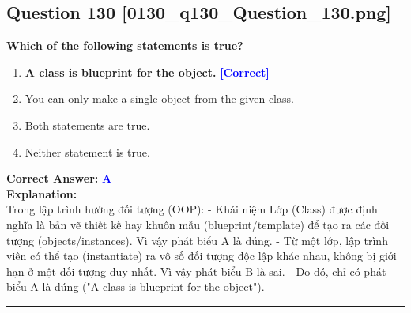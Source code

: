 \documentclass[11pt,a4paper]{article}
\begin{document}
\begin{minipage}{\textwidth}
\subsection*{Question 130 \quad \footnotesize{[0130_q130_Question_130.png]}}
\noindent \textbf{Which of the following statements is true?}

\begin{enumerate}[label=\Alph*.]
    \item \textbf{A class is blueprint for the object.} \hfill \textcolor{blue}{\textbf{[Correct]}}
    \item You can only make a single object from the given class.
    \item Both statements are true.
    \item Neither statement is true.
\end{enumerate}

\noindent \textbf{Correct Answer:} \textcolor{blue}{\textbf{A}} \\[4pt]
\noindent \textbf{Explanation:}\\
Trong lập trình hướng đối tượng (OOP):\newline
- Khái niệm Lớp (Class) được định nghĩa là bản vẽ thiết kế hay khuôn mẫu (blueprint/template) để tạo ra các đối tượng (objects/instances). Vì vậy phát biểu A là đúng.\newline
- Từ một lớp, lập trình viên có thể tạo (instantiate) ra vô số đối tượng độc lập khác nhau, không bị giới hạn ở một đối tượng duy nhất. Vì vậy phát biểu B là sai.\newline
- Do đó, chỉ có phát biểu A là đúng ("A class is blueprint for the object").
\end{minipage}
\vspace{0.8cm}
\hrule
\vspace{0.5cm}
\end{document}
